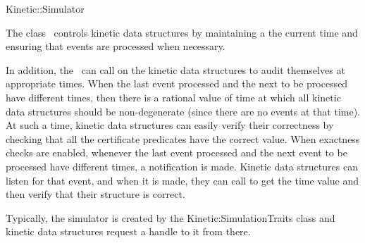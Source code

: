 

\begin{ccRefConcept}{Kinetic::Simulator}  %


\ccDefinition
  
The class \ccRefName\ controls kinetic data structures by maintaining
a the current time and ensuring that events are processed when
necessary.

In addition, the \ccRefName\ can call on the kinetic data structures
to audit themselves at appropriate times. When the last event
processed and the next to be processed have different times, then
there is a rational value of time at which all kinetic data structures
should be non-degenerate (since there are no events at that time). At
such a time, kinetic data structures can easily verify their
correctness by checking that all the certificate predicates have the
correct value. When exactness checks are enabled, whenever the last
event processed and the next event to be processed have different
times, a
 notification is made. Kinetic
data structures can listen for that event, and when it is made, they
can call  to get the time value and
then verify that their structure is correct.

Typically, the simulator is created by the Kinetic:SimulationTraits
class and kinetic data structures request a handle to it from there.


\ccTypes




\end{ccRefConcept}
